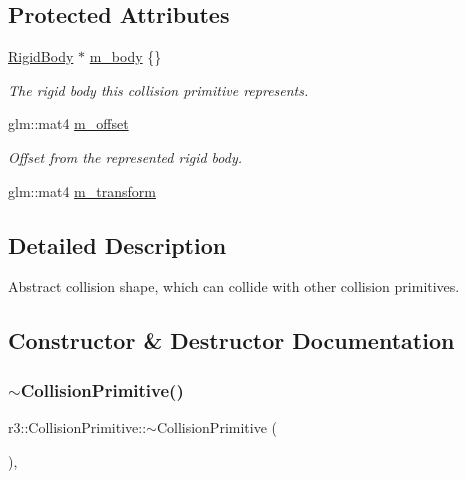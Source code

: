 \subsection*{Protected Attributes}
\begin{DoxyCompactItemize}
\item 
\mbox{\hyperlink{classr3_1_1_rigid_body}{Rigid\+Body}} $\ast$ \mbox{\hyperlink{classr3_1_1_collision_primitive_a3ae500c9bd222ec42d86696702e746db}{m\+\_\+body}} \{\}
\begin{DoxyCompactList}\small\item\em The rigid body this collision primitive represents. \end{DoxyCompactList}\item 
glm\+::mat4 \mbox{\hyperlink{classr3_1_1_collision_primitive_a15a51c2e72a8c5122a1031d6620a2901}{m\+\_\+offset}}
\begin{DoxyCompactList}\small\item\em Offset from the represented rigid body. \end{DoxyCompactList}\item 
glm\+::mat4 \mbox{\hyperlink{classr3_1_1_collision_primitive_a0cb28517e7791b9836a5cac5d8550b13}{m\+\_\+transform}}
\end{DoxyCompactItemize}


\subsection{Detailed Description}
Abstract collision shape, which can collide with other collision primitives. 

\subsection{Constructor \& Destructor Documentation}
\mbox{\label{classr3_1_1_collision_primitive_adfa75f14067cb33a3f0049895a3db880}} 
\subsubsection{\texorpdfstring{$\sim$\+Collision\+Primitive()}{~CollisionPrimitive()}}
{\footnotesize\ttfamily r3\+::\+Collision\+Primitive\+::$\sim$\+Collision\+Primitive (\begin{DoxyParamCaption}{ }\end{DoxyParamCaption})\hspace{0.3cm}{\ttfamily [virtual]}, {\ttfamily [default]}}

